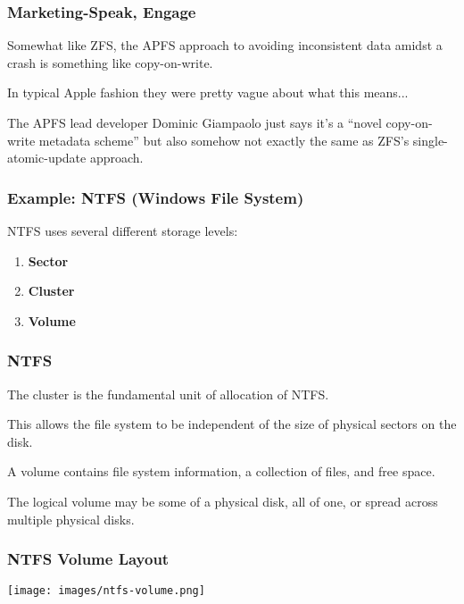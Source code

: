 \begin{frame}
	\frametitle{Marketing-Speak, Engage}

	Somewhat like ZFS, the APFS approach to avoiding inconsistent data amidst a crash is something like copy-on-write.

	In typical Apple fashion they were pretty vague about what this means...

	The APFS lead developer Dominic Giampaolo just says it's a ``novel copy-on-write metadata scheme'' but also somehow not exactly the same as ZFS's single-atomic-update approach.

\end{frame}


\begin{frame}
	\frametitle{Example: NTFS (Windows File System)}

	NTFS uses several different storage levels:

	\begin{enumerate}
		\item \textbf{Sector}
		\item \textbf{Cluster}
		\item \textbf{Volume}
	\end{enumerate}


\end{frame}

\begin{frame}
	\frametitle{NTFS}

	The cluster is the fundamental unit of allocation of NTFS.

	This allows the file system to be independent of the size of physical sectors on the disk.

	A volume contains file system information, a collection of files, and free space.

	The logical volume may be some of a physical disk, all of one, or spread across multiple physical disks.

\end{frame}

\begin{frame}
	\frametitle{NTFS Volume Layout}

	\begin{center}
		\texttt{[image: images/ntfs-volume.png]}
	\end{center}

\end{frame}

